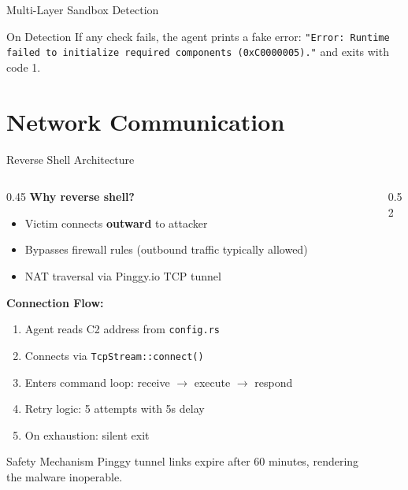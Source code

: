 \documentclass[aspectratio=169]{beamer}
\newcommand{\code}[1]{\texttt{\textcolor{primaryblue}{#1}}}
\begin{document}
\begin{frame}{Multi-Layer Sandbox Detection}
  \vspace{0.5em}
  \begin{warnbox}{On Detection}
    If any check fails, the agent prints a fake error: \code{"Error: Runtime failed to initialize required components (0xC0000005)."} and exits with code 1.
  \end{warnbox}
\end{frame}

\section{Network Communication}

\begin{frame}[fragile]{Reverse Shell Architecture}
  \begin{columns}[T]
    \begin{column}{0.45\textwidth}
      \textbf{Why reverse shell?}
      \begin{itemize}
        \item Victim connects \textbf{outward} to attacker
        \item Bypasses firewall rules (outbound traffic typically allowed)
        \item NAT traversal via Pinggy.io TCP tunnel
      \end{itemize}

      \vspace{0.5em}
      \textbf{Connection Flow:}
      \begin{enumerate}
        \item Agent reads C2 address from \code{config.rs}
        \item Connects via \code{TcpStream::connect()}
        \item Enters command loop: receive $\rightarrow$ execute $\rightarrow$ respond
        \item Retry logic: 5 attempts with 5s delay
        \item On exhaustion: silent exit
      \end{enumerate}

      \vspace{0.3em}
      \begin{infobox}{Safety Mechanism}
        Pinggy tunnel links expire after 60 minutes, rendering the malware inoperable.
      \end{infobox}
    \end{column}
    \begin{column}{0.52\textwidth}
      \centering
\end{column}
\end{columns}
\end{frame}
\end{document}
